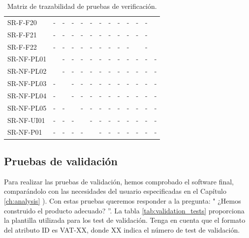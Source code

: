 \begin{table}[htb]
\begin{tabular}{@{}L{3cm}C{0.7cm}C{0.7cm}C{0.7cm}C{0.7cm}C{0.7cm}C{0.7cm}C{0.7cm}C{0.7cm}C{0.7cm}C{0.7cm}C{0.7cm}C{0.7cm}@{}}
    SR-F-F20 & - & - & - & - & - & - & - & - & - & - & - &  \\
    SR-F-F21 & - & - & - & - & - & - & - & - & - & - & - &  \\
    SR-F-F22 & - & - & - & - & - & - & - & - & - &  & - &  \\
    SR-NF-PL01 &  & - & - & - & - & - & - & - & - & - & - & - \\
    SR-NF-PL02 &  & - & - & - & - & - & - & - & - & - & - & - \\
    SR-NF-PL03 & - &  & - & - & - & - & - & - & - & - & - & - \\
    SR-NF-PL04 & - &  & - & - & - & - & - & - & - & - & - & - \\
    SR-NF-PL05 & - & - &  & - & - & - & - & - & - & - & - & - \\
    SR-NF-UI01 & - & - & - &  & - & - & - & - & - & - & - & - \\
    SR-NF-P01 & - & - & - & - &  & - & - & - & - & - & - & - \\
    \bottomrule
\end{tabular}
\caption{Matriz de trazabilidad de pruebas de verificación.}
\label{tab:verification_matrix}
\end{table}    

\clearpage

\subsection{Pruebas de validación}


Para realizar las pruebas de validación, hemos comprobado el software final, comparándolo con las necesidades del usuario especificadas en el Capítulo \ref{ch:analysis} \textit{}). Con estas pruebas queremos responder a la pregunta: " ¿Hemos construido el producto adecuado? ''. La tabla \ref{tab:validation_tests} proporciona la plantilla utilizada para los test de validación. Tenga en cuenta que el formato del atributo ID es VAT-XX, donde XX indica el número de test de validación.


